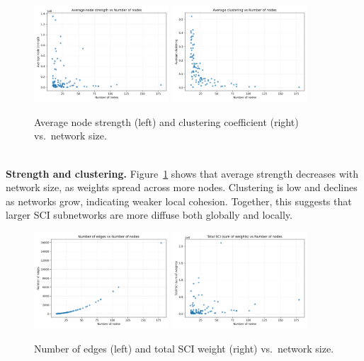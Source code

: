 \begin{figure}[h!]
    \centering
    \includegraphics[width=0.45\textwidth]{images/TASK3/metrics_avg_strength_vs_n_nodes.png}
    \includegraphics[width=0.45\textwidth]{images/TASK3/metrics_avg_clustering_vs_n_nodes.png}
    \caption{Average node strength (left) and clustering coefficient (right) vs.\ network size.}
    \label{fig:strength_clustering}
\end{figure}\\
\textbf{Strength and clustering.}  
Figure~\ref{fig:strength_clustering} shows that average strength decreases with network size, as weights spread across more nodes.  
Clustering is low and declines as networks grow, indicating weaker local cohesion.  
Together, this suggests that larger SCI subnetworks are more diffuse both globally and locally.\\
\begin{figure}[h!]
    \centering
    \includegraphics[width=0.45\textwidth]{images/TASK3/metrics_n_edges_vs_n_nodes.png}
    \includegraphics[width=0.45\textwidth]{images/TASK3/total_sci_vs_n_nodes.png}
    \caption{Number of edges (left) and total SCI weight (right) vs.\ network size.}
    \label{fig:edges_weight}
\end{figure}\\
